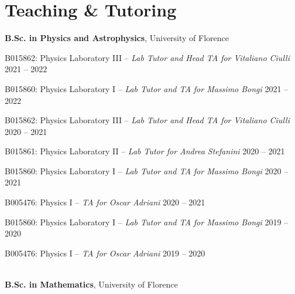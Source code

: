 \newcommand{\teaching}[2]
  {\normalsize \textbf{\color{hlcolor-0} #1}, {\color{hlcolor-1} #2}}
  
\newcommand{\teachclass}[3]
  {{\normalsize \color{maincolor} #1 --}
  {\small \color{maincolor} \emph{#2}} \hfill 
  {\normalsize \color{hlcolor-2} #3}}


\section*{Teaching \& Tutoring}
\begin{cvcontent}
  \teaching{B.Sc. in Physics and Astrophysics}{University of Florence}
  \\ [0.5mm]
  \begin{itemize*}[label=\textcolor{iconcolor}{\textbullet}]
    \item \teachclass{B015862: Physics Laboratory III}{Lab Tutor and Head TA for Vitaliano Ciulli}{2021 -- 2022}\\ [0.5mm]
    \item \teachclass{B015860: Physics Laboratory I}{Lab Tutor and TA for Massimo Bongi}{2021 -- 2022}\\ [0.5mm]
    \item \teachclass{B015862: Physics Laboratory III}{Lab Tutor and Head TA for Vitaliano Ciulli}{2020 -- 2021}\\ [0.5mm]
    \item \teachclass{B015861: Physics Laboratory II}{Lab Tutor for Andrea Stefanini}{2020 -- 2021}\\ [0.5mm]
    \item \teachclass{B015860: Physics Laboratory I}{Lab Tutor and TA for Massimo Bongi}{2020 -- 2021}\\ [0.5mm]
    \item \teachclass{B005476: Physics I}{TA for Oscar Adriani}{2020 -- 2021}\\ [0.5mm]
    \item \teachclass{B015860: Physics Laboratory I}{Lab Tutor and TA for Massimo Bongi}{2019 -- 2020}\\ [0.5mm]
    \item \teachclass{B005476: Physics I}{TA for Oscar Adriani}{2019 -- 2020}
  \end{itemize*}
  \\ [3mm]
  \teaching{B.Sc. in Mathematics}{University of Florence}

\end{cvcontent}
